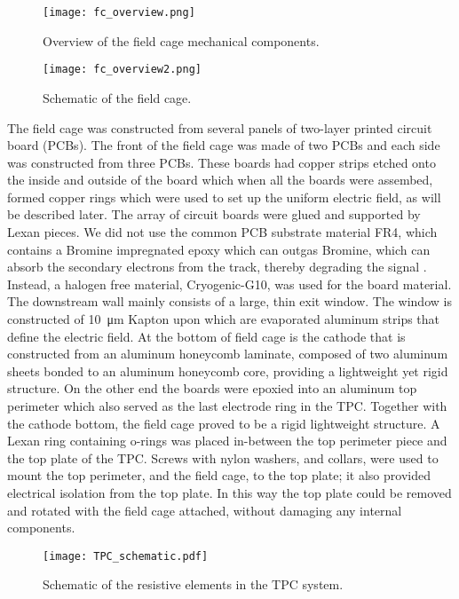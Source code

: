 \begin{figure}[!htb]
\texttt{[image: fc\_overview.png]}
\label{fig:fc_overview}
\caption{Overview of the field cage mechanical components.}
\end{figure}


\begin{figure}[!htb]
\texttt{[image: fc\_overview2.png]}
\label{fig:fc_overview2}
\caption{Schematic of the field cage.}
\end{figure}


The field cage was constructed from several panels of two-layer printed circuit board (PCBs). The front of the field cage was made of two PCBs and each side was constructed from three PCBs. These boards had copper strips etched onto the inside and outside of the board which when all the boards were assembed, formed copper rings which were used to set up the uniform electric field, as will be described later. The array of circuit boards were glued and supported by Lexan pieces. We did not use the common PCB substrate material FR4, which contains a Bromine impregnated epoxy which can outgas Bromine, which can absorb the secondary electrons from the track, thereby degrading the signal \cite{tpcAging}. Instead, a halogen free material, Cryogenic-G10, was used for the board material.  The downstream wall mainly consists of a large, thin exit window. The window  is constructed of   \SI{10}{\micro\metre} Kapton upon which are  evaporated aluminum strips that define the electric field. At the bottom of field cage is the cathode that is  constructed from an aluminum honeycomb laminate, composed of two aluminum sheets bonded to an aluminum honeycomb core, providing a lightweight yet rigid structure. On the other end the boards were epoxied into an aluminum top perimeter which also served as the last electrode ring in the TPC. Together with the cathode bottom, the field cage proved to be a rigid lightweight structure. A Lexan ring containing o-rings was placed in-between the top perimeter piece and the top plate of the TPC. Screws with nylon washers, and collars, were used to mount the top perimeter, and the field cage, to the top plate; it also provided electrical isolation from the top plate. In this way the top plate could be removed and rotated with the field cage attached, without damaging any internal components. 

\begin{figure}[!htb]
\centering
\texttt{[image: TPC\_schematic.pdf]}
\caption{Schematic of the resistive elements in the TPC system.}
\label{fig:TPC_schematic}
\end{figure}



